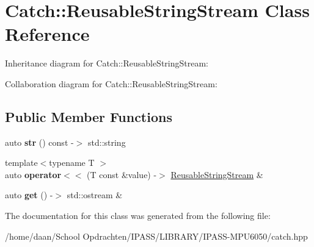 \hypertarget{classCatch_1_1ReusableStringStream}{}\section{Catch\+:\+:Reusable\+String\+Stream Class Reference}
\label{classCatch_1_1ReusableStringStream}


Inheritance diagram for Catch\+:\+:Reusable\+String\+Stream\+:


Collaboration diagram for Catch\+:\+:Reusable\+String\+Stream\+:
\subsection*{Public Member Functions}
\begin{DoxyCompactItemize}
\item 
\mbox{\label{classCatch_1_1ReusableStringStream_a0e9ecf260b2a5d35f4886ef0d51f6270}} 
auto {\bfseries str} () const -\/$>$ std\+::string
\item 
\mbox{\label{classCatch_1_1ReusableStringStream_af95f72024c082db70e5e50782e28e4f6}} 
{\footnotesize template$<$typename T $>$ }\\auto {\bfseries operator$<$$<$} (T const \&value) -\/$>$ \hyperlink{classCatch_1_1ReusableStringStream}{Reusable\+String\+Stream} \&
\item 
\mbox{\label{classCatch_1_1ReusableStringStream_a6881808c60a080d4e24a0b81c94cbf67}} 
auto {\bfseries get} () -\/$>$ std\+::ostream \&
\end{DoxyCompactItemize}


The documentation for this class was generated from the following file\+:\begin{DoxyCompactItemize}
\item 
/home/daan/\+School Opdrachten/\+I\+P\+A\+S\+S/\+L\+I\+B\+R\+A\+R\+Y/\+I\+P\+A\+S\+S-\/\+M\+P\+U6050/catch.\+hpp\end{DoxyCompactItemize}
